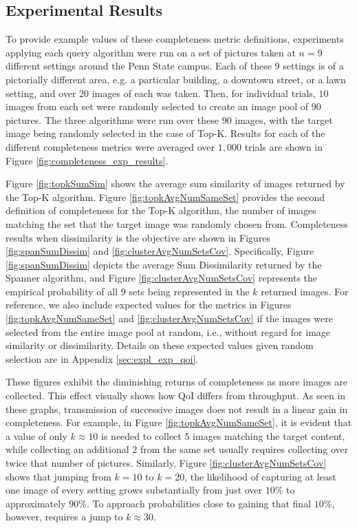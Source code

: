 \subsection{Experimental Results}

To provide example values of these completeness metric definitions, experiments applying each query algorithm were run on a set of pictures taken at $n = 9$ different settings around the Penn State campus.  Each of these $9$ settings is of a pictorially different area, e.g. a particular building, a downtown street, or a lawn setting, and over $20$ images of each was taken.  Then, for individual trials, $10$ images from each set were randomly selected to create an image pool of $90$ pictures.  The three algorithms were run over these $90$ images, with the target image being randomly selected in the case of Top-K.  Results for each of the different completeness metrics were averaged over $1,000$ trials are shown in Figure \ref{fig:completeness_exp_results}. %

Figure \ref{fig:topkSumSim} shows the average sum similarity of images returned by the Top-K algorithm.  Figure \ref{fig:topkAvgNumSameSet} provides the second definition of completeness for the Top-K algorithm, the number of images matching the set that the target image was randomly chosen from.  Completeness results when dissimilarity is the objective are shown in Figures \ref{fig:spanSumDissim} and \ref{fig:clusterAvgNumSetsCov}.  Specifically, Figure \ref{fig:spanSumDissim} depicts the average Sum Dissimilarity returned by the Spanner algorithm, and Figure \ref{fig:clusterAvgNumSetsCov} represents the empirical probability of all $9$ sets being represented in the $k$ returned images.   For reference, we also include expected values for the metrics in Figures \ref{fig:topkAvgNumSameSet} and \ref{fig:clusterAvgNumSetsCov} if the images were selected from the entire image pool at random, i.e., without regard for image similarity or dissimilarity.  Details on these expected values given random selection are in Appendix \ref{sec:expl_exp_qoi}.

These figures exhibit the diminishing returns of completeness as more images are collected.  This effect visually shows how QoI differs from throughput.  As seen in these graphs, transmission of successive images does not result in a linear gain in completeness.  For example, in Figure \ref{fig:topkAvgNumSameSet}, it is evident that a value of only $k \approx 10$ is needed to collect $5$ images matching the target content, while collecting an additional $2$ from the same set usually requires collecting over twice that number of pictures.  
Similarly, Figure \ref{fig:clusterAvgNumSetsCov} shows that jumping from $k=10$ to $k=20$, the likelihood of capturing at least one image of every setting grows substantially from just over $10\%$ to approximately $90\%$.  To approach probabilities close to gaining that final $10\%$, however, requires a jump to $k\approx30$.  

